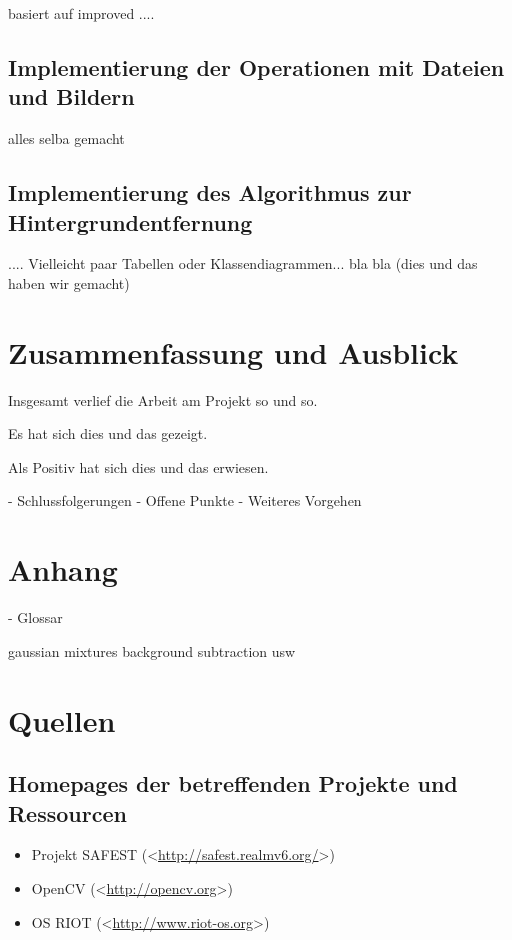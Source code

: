 \documentclass[10pt,a4paper]{article}
\begin{document}
basiert auf improved ....

\subsection{Implementierung der Operationen mit Dateien und Bildern}

alles selba gemacht

\subsection{Implementierung des Algorithmus zur Hintergrundentfernung}

.... Vielleicht paar Tabellen oder Klassendiagrammen...  bla bla
(dies und das haben wir gemacht)

\newpage
\section{Zusammenfassung und Ausblick}

Insgesamt verlief die Arbeit am Projekt so und so.

Es hat sich dies und das gezeigt.

Als Positiv hat sich dies und das erwiesen.

- Schlussfolgerungen
- Offene Punkte
- Weiteres Vorgehen

\newpage
\section{Anhang}

- Glossar

gaussian mixtures
background subtraction usw


\newpage
\section{Quellen}

\subsection*{Homepages der betreffenden Projekte und Ressourcen}
\begin{itemize}
\item Projekt SAFEST (\textless\href{http://safest.realmv6.org/}{http://safest.realmv6.org/}\textgreater)
\item OpenCV (\textless\href{http://opencv.org}{http://opencv.org}\textgreater)
\item OS RIOT (\textless\href{http://www.riot-os.org}{http://www.riot-os.org}\textgreater)
\end{itemize}
\end{document}
